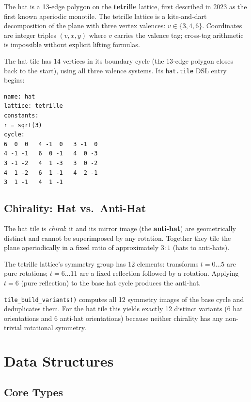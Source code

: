 \documentclass[10pt,a4paper]{article}
\let\polysection\section
\renewcommand\section{\needspace{0.16\textheight}\polysection}
\let\polysubsection\subsection
\renewcommand\subsection{\needspace{0.12\textheight}\polysubsection}
\newcommand{\code}[1]{\texttt{\small #1}}
\newcommand{\file}[1]{\texttt{\footnotesize #1}}
\begin{document}
The hat is a 13-edge polygon on the \textbf{tetrille} lattice, first
described in 2023 as the first known aperiodic monotile.  The tetrille
lattice is a kite-and-dart decomposition of the plane with three vertex
valences: $v \in \{3, 4, 6\}$.  Coordinates are integer triples
$(v, x, y)$ where $v$ carries the valence tag; cross-tag arithmetic is
impossible without explicit lifting formulas.

The hat tile has 14 vertices in its boundary cycle (the 13-edge polygon
closes back to the start), using all three valence systems.  Its
\file{hat.tile} DSL entry begins:
\begin{verbatim}
name: hat
lattice: tetrille
constants:
r = sqrt(3)
cycle:
6  0  0   4 -1  0   3 -1  0
4 -1 -1   6  0 -1   4  0 -3
3 -1 -2   4  1 -3   3  0 -2
4  1 -2   6  1 -1   4  2 -1
3  1 -1   4  1 -1
\end{verbatim}

\subsection{Chirality: Hat vs.\ Anti-Hat}

The hat tile is \emph{chiral}: it and its mirror image (the
\textbf{anti-hat}) are geometrically distinct and cannot be superimposed
by any rotation.  Together they tile the plane aperiodically in a fixed
ratio of approximately $3{:}1$ (hats to anti-hats).

The tetrille lattice's symmetry group has 12 elements: transforms
$t = 0\ldots 5$ are pure rotations; $t = 6\ldots 11$ are a fixed
reflection followed by a rotation.  Applying $t = 6$ (pure reflection)
to the base hat cycle produces the anti-hat.

\code{tile\_build\_variants()} computes all 12 symmetry images of the
base cycle and deduplicates them.  For the hat tile this yields exactly
12 distinct variants (6 hat orientations and 6 anti-hat orientations)
because neither chirality has any non-trivial rotational symmetry.

\section{Data Structures}

\subsection{Core Types}
\end{document}
